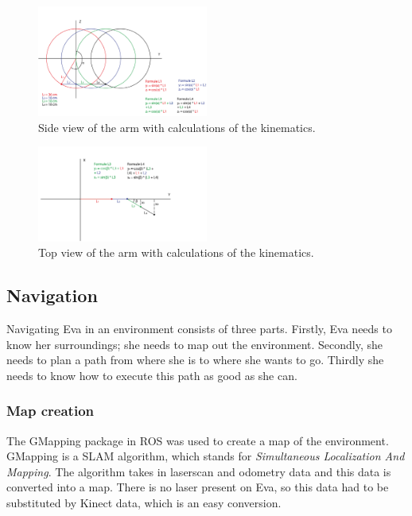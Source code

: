 \documentclass[project_eva.tex]{subfiles}
\begin{document}
\begin{figure}[h]
	\centering
	\mbox{\includegraphics[width=0.5\textwidth]{Images/2d_zijaanzicht.png}}
	\caption{Side view of the arm with calculations of the kinematics.}
	\label{fig:IK2}
\end{figure}

\begin{figure}[h]
	\centering
	\mbox{\includegraphics[width=0.5\textwidth]{Images/2d_bovenaanzicht.png}}
	\caption{Top view of the arm with calculations of the kinematics.}
	\label{fig:IK1}
\end{figure}

\subsection*{Navigation}
Navigating Eva in an environment consists of three parts. Firstly, Eva needs to know her surroundings; she needs to map out 
the environment. Secondly, she needs to plan a path from where she is to where she wants to go. Thirdly she needs to know 
how to execute this path as good as she can.

\subsubsection*{Map creation}
The GMapping package in ROS was used to create a map of the environment. GMapping \cite{GMapping} is a SLAM algorithm, 
which stands for \textit{Simultaneous Localization And Mapping}. The algorithm takes in laserscan and odometry data and 
this data is converted into a map. There is no laser present on Eva, so this data had to be substituted by Kinect data, 
which is an easy conversion.
\end{document}
